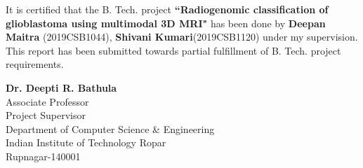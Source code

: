 


\begin{certificate}      %

It is certified that the B. Tech. project \textbf{``Radiogenomic classification of glioblastoma using multimodal 3D MRI"} has been done by \textbf{Deepan Maitra} (2019CSB1044), \textbf{Shivani Kumari}(2019CSB1120) under my supervision. 
This report has been submitted towards partial fulfillment of B. Tech. project requirements. \\

\vspace*{15mm}

\begin{flushright}
\textbf{Dr. Deepti R. Bathula }\\ Associate Professor \\ Project Supervisor \\ Department of Computer Science \& Engineering \\ Indian Institute of Technology Ropar \\ Rupnagar-140001
\end{flushright}


\end{certificate}



